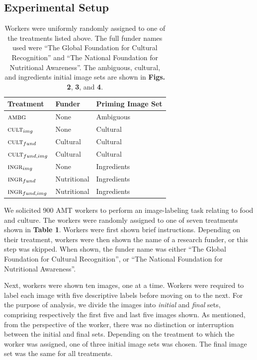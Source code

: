 \documentclass[a4paper]{report}
\begin{document}
\subsection*{Experimental Setup}
\begin{table}[t]
\centering
	\begin{tabular}{ l  l  l }
		\hline                       
		Treatment & Funder & Priming Image Set	\\ 
		\hline                       
		$\textsc{ambg}$ & None & Ambiguous\\
		$\textsc{cult}_{img}$ & None & Cultural\\
		$\textsc{cult}_{fund}$ & Cultural & Cultural\\
		$\textsc{cult}_{fund,img}$ & Cultural & Cultural\\
		$\textsc{ingr}_{img}$ & None & Ingredients\\
		$\textsc{ingr}_{fund}$ & Nutritional & Ingredients\\
		$\textsc{ingr}_{fund, img}$ & Nutritional & Ingredients\\
		\hline  
	\end{tabular}


	\begin{addmargin}[4em]{4em}
	\caption{ \footnotesize{ 
		Workers were uniformly randomly assigned to one of the 
		treatments listed above. 
		The full funder names used were 
		``The Global Foundation for Cultural Recognition'' and 
		``The National Foundation for Nutritional Awareness''.  
		The ambiguous, cultural, and ingredients initial image sets are shown 
		in \textbf{Figs. 2}, \textbf{3}, and \textbf{4}.
	}}
	\end{addmargin}
	\label{table:1}
\end{table}

We solicited 900 AMT workers to perform an image-labeling task relating to
food and culture.  The workers were randomly assigned to one of seven 
treatments shown in \textbf{Table 1}.  Workers were first shown brief 
instructions.  Depending on their treatment, workers were then shown the 
name of a research funder, or this step was skipped.  When shown, 
the funder name was either
``The Global Foundation for Cultural Recognition'', or 
``The National Foundation for Nutritional Awareness''.  

Next, workers were
shown ten images, one at a time. Workers were required to label each image 
with five descriptive labels before moving on to the next.  For the purpose 
of analysis, we divide the images
into \textit{initial} and \textit{final} sets, comprising respectively the 
first five and last five images shown.  As mentioned, from the perspective of 
the worker, there was no 
distinction or interruption between the initial and final sets. 
Depending on the treatment to which the worker was assigned, one of three 
initial image sets was chosen. The final image set was the same for all 
treatments.
\end{document}
